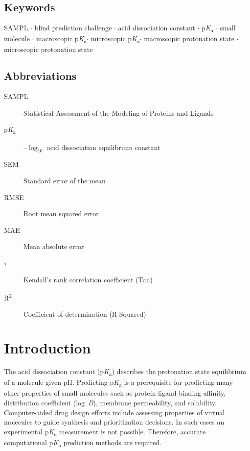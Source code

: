 \documentclass[9pt,lineno,final]{elife}
\newcommand{\pKa}{p\textit{K}\textsubscript{a}}
\newcommand{\logD}{log~\textit{D}}
\begin{document}
\subsection{Keywords}
SAMPL $\cdot$ blind prediction challenge $\cdot$ acid dissociation constant $\cdot$ \pKa{} $\cdot$ small molecule $\cdot$ macroscopic \pKa $\cdot$ microscopic \pKa  $\cdot$ macroscopic protonation state $\cdot$ microscopic protonation state

\subsection{Abbreviations}
\begin{description}
\item[SAMPL] Statistical Assessment of the Modeling of Proteins and Ligands
\item[\pKa]  --${\log_{10}}$ acid dissociation equilibrium constant 
\item[SEM] Standard error of the mean
\item[RMSE] Root mean squared error
\item[MAE] Mean absolute error
\item[{$\tau$}] Kendall's rank correlation coefficient (Tau)
\item[R\textsuperscript{2}] Coefficient of determination (R-Squared)
\end{description}


\section{Introduction}

The acid dissociation constant (\pKa{}) describes the protonation state equilibrium of a molecule given pH. 
Predicting \pKa{} is a prerequisite for predicting many other properties of small molecules such as protein-ligand binding affinity, distribution coefficient (\logD{}), membrane permeability, and solubility. 
Computer-aided drug design efforts include assessing properties of virtual molecules to guide synthesis and prioritization decisions. 
In such cases an experimental \pKa{} measurement is not possible. Therefore, accurate computational \pKa{} prediction methods are required.
\end{document}
